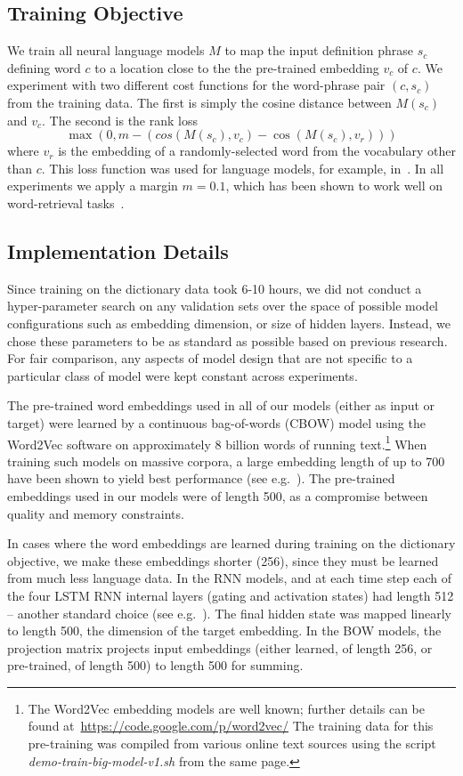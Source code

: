 \subsection{Training Objective}

We train all neural language models \(M\) to map the input definition phrase \(s_c\) defining word \(c\) to a location close to the the pre-trained embedding \(v_c\) of \(c\). We experiment with two different cost functions for the word-phrase pair \((c,s_c)\) from the training data. The first is simply the cosine distance between \(M(s_c)\) and \(v_c\). The second is the rank loss 
\[
\max(0, m - (cos(M(s_c),v_c)-\cos(M(s_c),v_r)))
\] 
where \(v_r\) is the embedding of a randomly-selected word from the vocabulary other than \(c\). This loss function was used for language models, for example, in~\cite{huang2012improving}. In all experiments we apply a margin \(m = 0.1\), which has been shown to work well on word-retrieval tasks~\cite{bordes2015large}. 

\subsection{Implementation Details}
Since training on the dictionary data took 6-10 hours, we did not conduct a hyper-parameter search on any validation sets over the space of possible model configurations such as embedding dimension, or size of hidden layers. Instead, we chose these parameters to be as standard as possible based on previous research. For fair comparison, any aspects of model design that are not specific to a particular class of model were kept constant across experiments. 

The pre-trained word embeddings used in all of our models (either as input or target) were learned by a continuous bag-of-words (CBOW) model using the Word2Vec software on approximately 8 billion words of running text.\footnote{The Word2Vec embedding models are well known; further details can be found at~\url{https://code.google.com/p/word2vec/} The training data for this pre-training was compiled from various online text sources using the script \emph{demo-train-big-model-v1.sh} from the same page.} When training such models on massive corpora, a large embedding length of up to 700 have been shown to yield best performance (see e.g.~\cite{faruqui2014retrofitting}). The pre-trained embeddings used in our models were of length 500, as a compromise between quality and memory constraints.

In cases where the word embeddings are learned during training on the dictionary objective, we make these embeddings shorter (256), since they must be learned from much less language data. In the RNN models, and at each time step each of the four LSTM RNN internal layers (gating and activation states) had length 512 -- another standard choice (see e.g.~\cite{cho2014learning}). The final hidden state was mapped linearly to length 500, the dimension of the target embedding. In the BOW models, the projection matrix projects input embeddings (either learned, of length 256, or pre-trained, of length 500) to length 500 for summing. 

